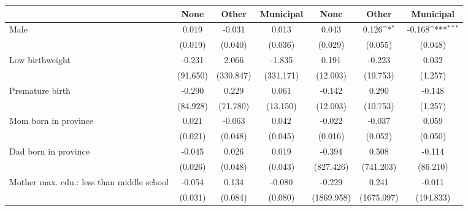 {
\def\sym#1{\ifmmode^{#1}\else\(^{#1}\)\fi}
\begin{tabular}{l*{6}{c}}
\toprule
                    &\multicolumn{1}{c}{None}&\multicolumn{1}{c}{Other}&\multicolumn{1}{c}{Municipal}&\multicolumn{1}{c}{None}&\multicolumn{1}{c}{Other}&\multicolumn{1}{c}{Municipal}\\
\midrule
Male                &       0.019         &      -0.031         &       0.013         &       0.043         &       0.126\sym{*}  &      -0.168\sym{***}\\
                    &     (0.019)         &     (0.040)         &     (0.036)         &     (0.029)         &     (0.055)         &     (0.048)         \\
\addlinespace
Low birthweight     &      -0.231         &       2.066         &      -1.835         &       0.191         &      -0.223         &       0.032         \\
                    &    (91.650)         &   (330.847)         &   (331.171)         &    (12.003)         &    (10.753)         &     (1.257)         \\
\addlinespace
Premature birth     &      -0.290         &       0.229         &       0.061         &      -0.142         &       0.290         &      -0.148         \\
                    &    (84.928)         &    (71.780)         &    (13.150)         &    (12.003)         &    (10.753)         &     (1.257)         \\
\addlinespace
Mom born in province&       0.021         &      -0.063         &       0.042         &      -0.022         &      -0.037         &       0.059         \\
                    &     (0.021)         &     (0.048)         &     (0.045)         &     (0.016)         &     (0.052)         &     (0.050)         \\
\addlinespace
Dad born in province&      -0.045         &       0.026         &       0.019         &      -0.394         &       0.508         &      -0.114         \\
                    &     (0.026)         &     (0.048)         &     (0.043)         &   (827.426)         &   (741.203)         &    (86.210)         \\
\addlinespace
Mother max. edu.: less than middle school&      -0.054         &       0.134         &      -0.080         &      -0.229         &       0.241         &      -0.011         \\
                    &     (0.031)         &     (0.084)         &     (0.080)         &  (1869.958)         &  (1675.097)         &   (194.833)         \\

\end{tabular}}
